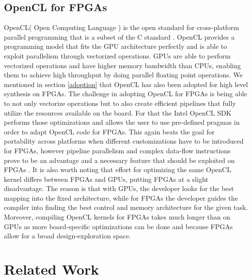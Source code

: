 \subsection{OpenCL for FPGAs}
OpenCL\texttrademark ( Open Computing Language ) is the open standard for cross-platform parallel programming that is a subset of the C standard \cite{opencl}. OpenCL provides a programming model that fits the GPU architecture perfectly and is able to exploit parallelism through vectorized operations. GPUs are able to perform vectorized operations and have higher memory bandwidth than CPUs, enabling them to achieve high throughput by doing parallel floating point operations. We mentioned in section \ref{adoption} that OpenCL has also been adopted for high level synthesis on FPGAs. The challenge in adopting OpenCL for FPGAs is being able to not only vectorize operations but to also create efficient pipelines that fully utilize the resources available on the board. For that the Intel OpenCL SDK \cite{intel2016sdk, deepfpga} performs those optimizations and allows the user to use pre-defined pragmas in order to adapt OpenCL code for FPGAs. This again beats the goal for portability across platforms when different customizations have to be introduced for FPGAs, however pipeline parallelism and complex data-flow instructions prove to be an advantage and a necessary feature that should be exploited on FPGAs \cite{ddl, deepfpga}.  It is also worth noting that effort for optimizing the same OpenCL kernel differs between FPGAs and GPUs, putting FPGAs at a slight disadvantage. The reason is that with GPUs, the developer looks for the best mapping into the fixed architecture, while for FPGAs the developer guides the compiler into finding the best control and memory architecture for the given task. Moreover, compiling OpenCL kernels for FPGAs takes much longer than on GPUs as more board-specific optimizations can be done and because FPGAs allow for a broad design-exploration space.


\section{Related Work}

